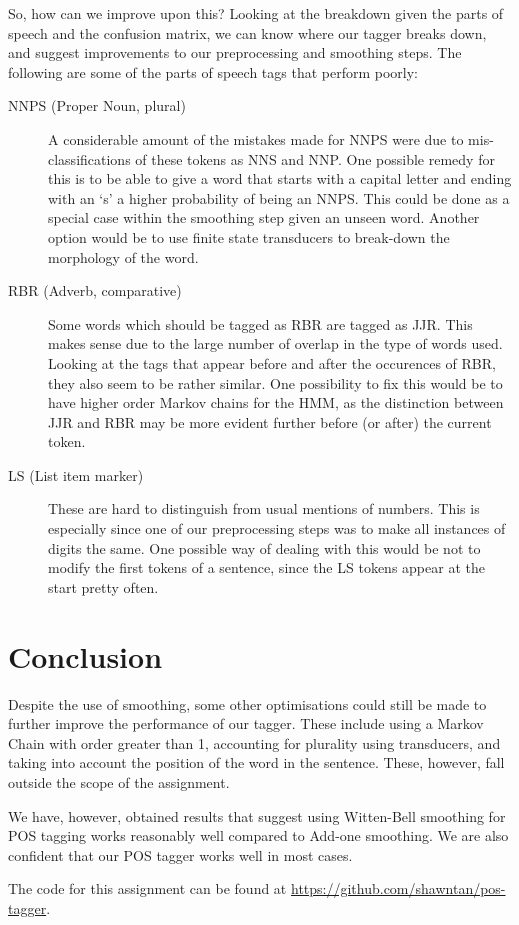 \documentclass[12pt]{homework}
\begin{document}
So, how can we improve upon this? Looking at the breakdown given the parts of 
speech and the confusion matrix, we can know where our tagger breaks down, and 
suggest improvements to our preprocessing and smoothing steps. The following are 
some of the parts of speech tags that perform poorly:
\begin{description}
	\item[NNPS (Proper Noun, plural)] A considerable amount of the mistakes made 
		for NNPS were due to mis-classifications of these tokens as NNS and NNP.  
		One possible remedy for this is to be able to give a word that starts 
		with a capital letter and ending with an `s' a higher probability of 
		being an NNPS. This could be done as a special case within the smoothing 
		step given an unseen word. Another option would be to use finite state 
		transducers to break-down the morphology of the word.
	\item[RBR (Adverb, comparative)] Some words which should be tagged as RBR 
		are tagged as JJR. This makes sense due to the large number of overlap 
		in the type of words used. Looking at the tags
 that appear before and 
		after the occurences of RBR, they also seem to be rather similar. One 
		possibility to fix this would be to have higher order Markov chains for 
		the HMM, as the distinction between JJR and RBR may be more evident 
		further before (or after) the current token.
	\item[LS (List item marker)] These are hard to distinguish from usual 
		mentions of numbers.  This is especially since one of our preprocessing 
		steps was to make all instances of digits the same. One possible way of 
		dealing with this would be not to modify the first tokens of a sentence, 
		since the LS tokens appear at the start pretty often.
\end{description}

\section{Conclusion}
Despite the use of smoothing, some other optimisations could still be made to 
further improve the performance of our tagger. These include using a Markov 
Chain with order greater than 1, accounting for plurality using transducers, and 
taking into account the position of the word in the sentence. These, however, 
fall outside the scope of the assignment.

We have, however, obtained results that suggest using Witten-Bell smoothing for 
POS tagging works reasonably well compared to Add-one smoothing. We are also 
confident that our POS tagger works well in most cases.

The code for this assignment can be found at  
\url{https://github.com/shawntan/pos-tagger}.
\end{document}
